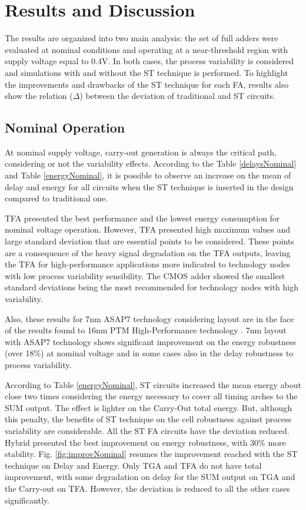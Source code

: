\documentclass[ecp,tc, english]{iiufrgs}
\begin{document}
\chapter{Results and Discussion}

The results are organized into two main analysis: the set of full adders were evaluated at nominal conditions and operating at a near-threshold region with supply voltage equal to 0.4V. In both cases, the process variability is considered and simulations with and without the ST technique is performed. To highlight the improvements and drawbacks of the ST technique for each FA, results also show the relation (\(\Delta\)) between the deviation of traditional and ST circuits.

\section{Nominal Operation}

At nominal supply voltage, carry-out generation is always the critical path, considering or not the variability effects. According to the Table \ref{delaysNominal} and Table \ref{energyNominal}, it is possible to observe an increase on the mean of delay and energy for all circuits when the ST technique is inserted in the design compared to traditional one.

TFA presented the best performance and the lowest energy consumption for nominal voltage operation. However, TFA presented high maximum values and large standard deviation that are essential points to be considered. These points are a consequence of the heavy signal degradation on the TFA outputs, leaving the TFA for high-performance applications more indicated to technology nodes with low process variability sensibility. The CMOS adder showed the smallest standard deviations being the most recommended for technology nodes with high variability. 

Also, these results for 7nm ASAP7 technology considering layout are in the face of the results found to 16nm PTM High-Performance technology \cite{samuel2016}. 7nm layout with ASAP7 technology shows significant improvement on the energy robustness (over 18\%) at nominal voltage and in some cases also in the delay robustness to process variability. 

According to Table \ref{energyNominal}, ST circuits increased the mean energy about close two times considering the energy necessary to cover all timing arches to the SUM output. The effect is lighter on the Carry-Out total energy. But, although this penalty, the benefits of ST technique on the cell robustness against process variability are considerable. All the ST FA circuits have the deviation reduced. Hybrid presented the best improvement on energy robustness, with 30\% more stability. Fig. \ref{fig:improvNominal} resumes the improvement reached with the ST technique on Delay and Energy. Only TGA and TFA do not have total improvement, with some degradation on delay for the SUM output on TGA and the Carry-out on TFA. However, the deviation is reduced to all the other cases significantly.
\end{document}
